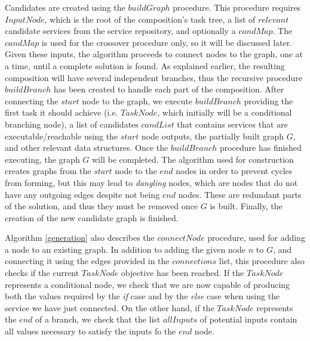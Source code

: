 Candidates are created using the $buildGraph$ procedure. This procedure requires $InputNode$, which is the root of the composition's task tree, a list of $relevant$ candidate services from the service repository, and optionally a $candMap$. The $candMap$ is used for the crossover procedure only, so it will be discussed later. Given these inputs, the algorithm proceeds to connect nodes to the graph, one at a time, until a complete solution is found. As explained earlier, the resulting composition will have several independent branches, thus the recursive procedure $buildBranch$ has been created to handle each part of the composition. After connecting the $start$ node to the graph, we execute $buildBranch$ providing the first task it should achieve (i.e. $TaskNode$, which initially will be a conditional branching node), a list of candidates $candList$ that contains services that are executable/reachable using the $start$ node outputs, the partially built graph $G$, and other relevant data structures. Once the $buildBranch$ procedure has finished executing, the graph $G$ will be completed. The algorithm used for construction creates graphs from the $start$ node to the $end$ nodes in order to prevent cycles from forming, but this may lead to \textit{dangling} nodes, which are nodes that do not have any outgoing edges despite not being $end$ nodes. These are redundant parts of the solution, and thus they must be removed once $G$ is built. Finally, the creation of the new candidate graph is finished.

Algorithm \ref{generation} also describes the $connectNode$ procedure, used for adding a node to an existing graph. In addition to adding the given node $n$ to $G$, and connecting it using the edges provided in the $connections$ list, this procedure also checks if the current $TaskNode$ objective has been reached. If the $TaskNode$ represents a conditional node, we check that we are now capable of producing both the  values required by the \textit{if} case and by the \textit{else} case when using the service we have just connected. On the other hand, if the $TaskNode$ represents the $end$ of a branch, we check that the list $allInputs$ of potential inputs contain all values necessary to satisfy the inputs fo the $end$ node.

